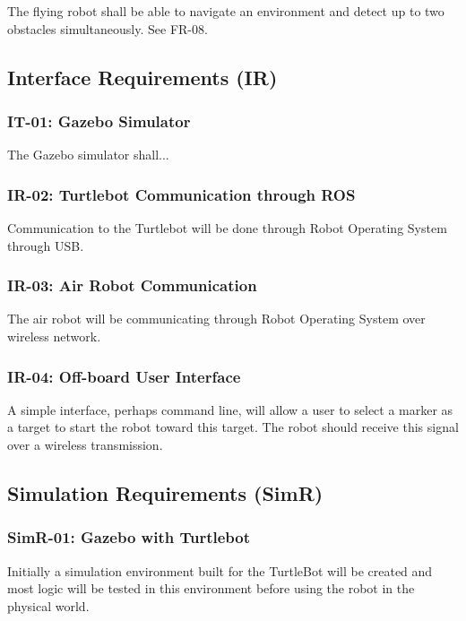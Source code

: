 \documentclass{article}
\begin{document}
		The flying robot shall be able to navigate an environment and detect up to two obstacles simultaneously. See FR-08.
		
	\subsection{Interface Requirements (IR)}

		\subsubsection{IT-01: Gazebo Simulator}
		The Gazebo simulator shall...
	
		\subsubsection{IR-02: Turtlebot Communication through ROS}
		
		Communication to the Turtlebot will be done through Robot Operating System through USB.
		
		\subsubsection{IR-03: Air Robot Communication}
		
		The air robot will be communicating through Robot Operating System over wireless network.
		
		\subsubsection{IR-04: Off-board User Interface}
		
		A simple interface, perhaps command line, will allow a user to select a marker as a target to start the robot toward this target. The robot should receive this signal over a wireless transmission.
		
	\subsection{Simulation Requirements (SimR)}
	
		\subsubsection{SimR-01: Gazebo with Turtlebot}
		
		Initially a simulation environment built for the TurtleBot will be created and most logic will be tested in this environment before using the robot in the physical world.
		
\end{document}

